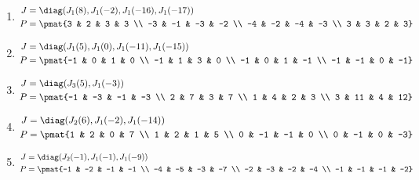 \begin{enumerate}
\item

\begin{align*}
J &= \diag(J_{1}(8), J_{1}(-2), J_{1}(-16), J_{1}(-17))\\
P &= \pmat{3 & 2 & 3 & 3 \\ -3 & -1 & -3 & -2 \\ -4 & -2 & -4 & -3 \\ 3 & 3 & 2 & 3}
\end{align*}

\item

\begin{align*}
J &= \diag(J_{1}(5), J_{1}(0), J_{1}(-11), J_{1}(-15))\\
P &= \pmat{-1 & 0 & 1 & 0 \\ -1 & 1 & 3 & 0 \\ -1 & 0 & 1 & -1 \\ -1 & -1 & 0 & -1}
\end{align*}

\item

\begin{align*}
J &= \diag(J_{3}(5), J_{1}(-3))\\
P &= \pmat{-1 & -3 & -1 & -3 \\ 2 & 7 & 3 & 7 \\ 1 & 4 & 2 & 3 \\ 3 & 11 & 4 & 12}
\end{align*}

\item

\begin{align*}
J &= \diag(J_{2}(6), J_{1}(-2), J_{1}(-14))\\
P &= \pmat{1 & 2 & 0 & 7 \\ 1 & 2 & 1 & 5 \\ 0 & -1 & -1 & 0 \\ 0 & -1 & 0 & -3}
\end{align*}

\item

\begin{align*}
J &= \diag(J_{2}(-1), J_{1}(-1), J_{1}(-9))\\
P &= \pmat{-1 & -2 & -1 & -1 \\ -4 & -5 & -3 & -7 \\ -2 & -3 & -2 & -4 \\ -1 & -1 & -1 & -2}
\end{align*}


\end{enumerate}
